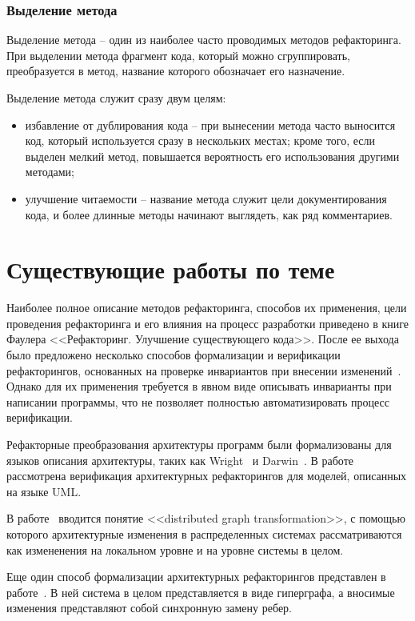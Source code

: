 \subsubsection{Выделение метода}
Выделение метода -- один из наиболее часто проводимых методов рефакторинга.
При выделении метода фрагмент кода, который можно сгруппировать, преобразуется в метод,
название которого обозначает его назначение.

Выделение метода служит сразу двум целям:
\begin{itemize}
    \item избавление от дублирования кода -- при вынесении метода часто выносится код, который используется сразу в нескольких местах;
    кроме того, если выделен мелкий метод, повышается вероятность его использования другими методами;
    \item улучшение читаемости -- название метода служит цели документирования кода,
    и более длинные методы начинают выглядеть, как ряд комментариев.
\end{itemize}
\section{Существующие работы по теме}
Наиболее полное описание методов рефакторинга, способов их применения, цели проведения рефакторинга и его влияния на процесс разработки
приведено в книге Фаулера <<Рефакторинг. Улучшение существующего кода>>.
После ее выхода было предложено несколько способов формализации и верификации рефакторингов,
основанных на проверке инвариантов при внесении изменений~\cite{Rustan04objectinvariants, DBLP:journals/eceasst/MassoniGB06}.
Однако для их применения требуется в явном виде описывать инварианты при написании программы,
что не позволяет полностью автоматизировать процесс верификации.

Рефакторные преобразования архитектуры программ были формализованы для языков описания архитектуры,
таких как Wright~\cite{Allen98specifyingand} и Darwin~\cite{Ehrig:2006:FAG:1121741}.
В работе~\cite{Bisztray_verificationof} рассмотрена верификация архитектурных рефакторингов для моделей,
описанных на языке UML.

В работе~\cite{Taentzer:1998:DCM:645872.668868} вводится понятие <<distributed graph transformation>>,
с помощью которого архитектурные изменения в распределенных системах рассматриваются как
измененения на локальном уровне и на уровне системы в целом.

Еще один способ формализации архитектурных рефакторингов представлен в работе~\cite{Hirsch:1998:GGC:288408.288426}.
В ней система в целом представляется в виде гиперграфа, а вносимые изменения
представляют собой синхронную замену ребер.

